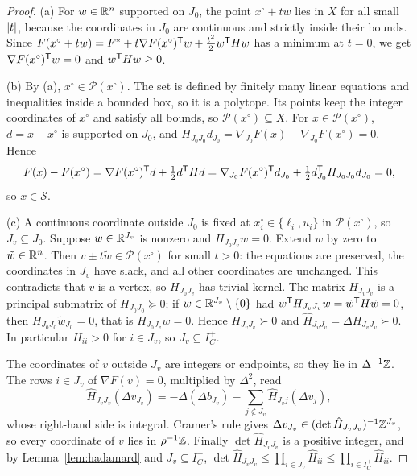 \begin{proof}
(a) For $w\in\mathbb R^n$ supported on $J_0$, the point $x^\circ+tw$ lies in $X$ for all
small $\lvert t\rvert$, because the coordinates in $J_0$ are continuous and strictly
inside their bounds. Since
$F(x^\circ+tw)=F^{*}+t\nabla F(x^\circ)^{\mathsf T}w+\frac{t^2}2w^{\mathsf T}Hw$ has a minimum at $t=0$,
we get $\nabla F(x^\circ)^{\mathsf T}w=0$ and $w^{\mathsf T}Hw\ge0$.

(b) By (a), $x^\circ\in\mathcal P(x^\circ)$. The set is defined by finitely many linear
equations and inequalities inside a bounded box, so it is a polytope. Its
points keep the integer coordinates of $x^\circ$ and satisfy all bounds, so
$\mathcal P(x^\circ)\subseteq X$. For $x\in\mathcal P(x^\circ)$, $d=x-x^\circ$ is supported on
$J_0$, and $H_{J_0J_0}d_{J_0}=\nabla_{J_0}F(x)-\nabla_{J_0}F(x^\circ)=0$. Hence
\[
F(x)-F(x^\circ)=\nabla F(x^\circ)^{\mathsf T}d+\tfrac12d^{\mathsf T}Hd
=\nabla_{J_0}F(x^\circ)^{\mathsf T}d_{J_0}+\tfrac12d_{J_0}^{\mathsf T}H_{J_0J_0}d_{J_0}=0 ,
\]
so $x\in\mathcal S$.

(c) A continuous coordinate outside $J_0$ is fixed at $x^\circ_i\in\{\ell_i,u_i\}$
in $\mathcal P(x^\circ)$, so $J_v\subseteq J_0$. Suppose $w\in\mathbb R^{J_v}$ is nonzero and
$H_{J_0J_v}w=0$. Extend $w$ by zero to $\tilde w\in\mathbb R^n$. Then
$v\pm t\tilde w\in\mathcal P(x^\circ)$ for small $t>0$: the equations are preserved,
the coordinates in $J_v$ have slack, and all other coordinates are unchanged.
This contradicts that $v$ is a vertex, so $H_{J_0J_v}$ has trivial kernel. The
matrix $H_{J_vJ_v}$ is a principal submatrix of $H_{J_0J_0}\succeq0$; if
$w\in\mathbb R^{J_v}\setminus\{0\}$ had $w^{\mathsf T}H_{J_vJ_v}w=\tilde w^{\mathsf T}H\tilde w=0$, then
$H_{J_0J_0}\tilde w_{J_0}=0$, that is $H_{J_0J_v}w=0$. Hence $H_{J_vJ_v}\succ0$ and
$\hat H_{J_vJ_v}=\Delta H_{J_vJ_v}\succ0$. In particular $H_{ii}>0$ for $i\in J_v$, so
$J_v\subseteq I_C^+$.

The coordinates of $v$ outside $J_v$ are integers or endpoints, so they lie in
$\Delta^{-1}\mathbb Z$. The rows $i\in J_v$ of $\nabla F(v)=0$, multiplied by
$\Delta^2$, read
\[
\hat H_{J_vJ_v}(\Delta v_{J_v})=-\Delta(\Delta b_{J_v})-\sum_{j\notin J_v}\hat H_{J_vj}(\Delta v_j),
\]
whose right-hand side is integral. Cramer's rule gives
$\Delta v_{J_v}\in(\det\hat H_{J_vJ_v})^{-1}\mathbb Z^{J_v}$, so every coordinate of $v$ lies in
$\rho^{-1}\mathbb Z$. Finally $\det\hat H_{J_vJ_v}$ is a positive integer, and by
Lemma~\ref{lem:hadamard} and $J_v\subseteq I_C^+$,
$\det\hat H_{J_vJ_v}\le\prod_{i\in J_v}\hat H_{ii}\le\prod_{i\in I_C^+}\hat H_{ii}$.
\end{proof}

